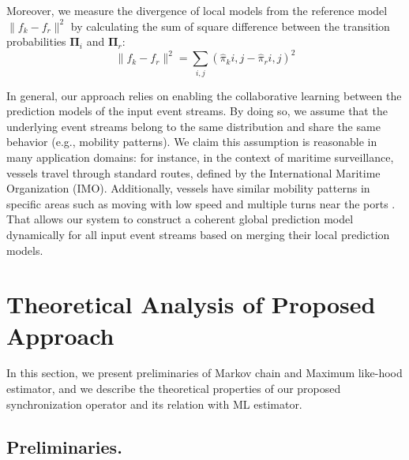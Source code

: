 \par Moreover, we measure the divergence of local models from the reference model  $\|f_k - f_r\|^2$ by calculating the sum of square difference between the transition probabilities  $\boldsymbol{\Pi}_i$ and  $\boldsymbol{\Pi}_r$:
\begin{equation*}
\label{eq:dis_pi_varinace}
\|f_k - f_r\|^2=\sum_{i,j} (\hat{\pi}_k{i,j} -\hat{\pi}_r{i,j})^2
\end{equation*}
\par In general, our approach relies on enabling the collaborative learning between the prediction models of  the input event streams. By doing so, we assume that the underlying event streams belong to the same  distribution and share the same behavior (e.g., mobility patterns). We claim this assumption is reasonable in many application domains: for instance, in the context of maritime surveillance, vessels travel through standard routes, defined by the International Maritime Organization (IMO). Additionally, vessels have similar mobility patterns in specific areas such as moving with low speed and multiple turns near the ports \cite{pallotta2013vessel,liu2014knowledge}. That allows our system to construct a coherent global prediction model dynamically for all input event streams based on merging their local prediction models.


\section{Theoretical Analysis of Proposed Approach}
 
 In this section, we present preliminaries of Markov chain and Maximum like-hood estimator, and we describe the theoretical properties of our proposed synchronization operator and its relation with ML estimator.  
 
 
 \subsection*{Preliminaries.}

